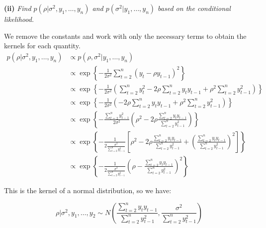 \documentclass[12pt]{article}
\begin{document}
\newpage

\noindent \textbf{(ii)} \emph{Find $p(\rho|\sigma^2,y_1,\ldots,y_n)$ and $p(\sigma^2|y_1,\ldots,y_n)$ based on the conditional likelihood.}
\bigskip

\noindent We remove the constants and work with only the necessary terms to obtain the kernels for each quantity.
\begin{align*}
p(\rho|\sigma^2,y_1,\ldots,y_n) &\propto p(\rho,\sigma^2|y_1,\ldots,y_n) \\
&\propto \exp\left\{-\frac{1}{2\sigma^2}\sum_{t=2}^n(y_t-\rho y_{t-1})^2\right\} \\
&\propto \exp\left\{-\frac{1}{2\sigma^2}\left(\sum_{t=2}^ny_t^2 - 2\rho\sum_{t=2}^ny_t y_{t-1}+\rho^2\sum_{t=2}^ny_{t-1}^2\right)\right\} \\
&\propto \exp\left\{-\frac{1}{2\sigma^2}\left(- 2\rho\sum_{t=2}^ny_t y_{t-1}+\rho^2\sum_{t=2}^ny_{t-1}^2\right)\right\} \\
&\propto \exp\left\{-\frac{\sum_{t=2}^ny_{t-1}^2}{2\sigma^2}\left(\rho^2 - 2\rho\frac{\sum_{t=2}^ny_t y_{t-1}}{\sum_{t=2}^ny_{t-1}^2}\right)\right\} \\
&\propto \exp\left\{-\frac{1}{2\frac{\sigma^2}{\sum_{t=2}^ny_{t-1}^2}}\left[\rho^2 - 2\rho\frac{\sum_{t=2}^ny_t y_{t-1}}{\sum_{t=2}^ny_{t-1}^2} + \left(\frac{\sum_{t=2}^ny_t y_{t-1}}{\sum_{t=2}^ny_{t-1}^2}\right)^2\right]\right\} \\
&\propto \exp\left\{-\frac{1}{2\frac{\sigma^2}{\sum_{t=2}^ny_{t-1}^2}}\left(\rho - \frac{\sum_{t=2}^ny_t y_{t-1}}{\sum_{t=2}^ny_{t-1}^2} \right)^2\right\}
\end{align*}

\noindent This is the kernel of a normal distribution, so we have:

\[\rho|\sigma^2,y_1,\ldots,y_2\sim N\left(\frac{\sum_{t=2}^ny_t y_{t-1}}{\sum_{t=2}^ny_{t-1}^2}, \frac{\sigma^2}{\sum_{t=2}^ny_{t-1}^2}\right) \]
\end{document}
